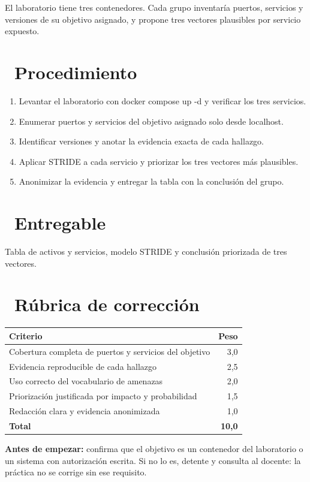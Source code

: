 \documentclass[11pt,a4paper]{article}
\newcommand{\iconotexto}[2]{\textcolor{cyanNeon}{\faIcon{#1}}~#2}
\begin{document}
El laboratorio tiene tres contenedores. Cada grupo inventaría puertos, servicios y versiones de su objetivo asignado, y propone tres vectores plausibles por servicio expuesto.


\section{\iconotexto{list-ol}{Procedimiento}}

\begin{enumerate}[leftmargin=1.4em,itemsep=2pt,topsep=3pt]
  \item Levantar el laboratorio con docker compose up -d y verificar los tres servicios.
  \item Enumerar puertos y servicios del objetivo asignado solo desde localhost.
  \item Identificar versiones y anotar la evidencia exacta de cada hallazgo.
  \item Aplicar STRIDE a cada servicio y priorizar los tres vectores más plausibles.
  \item Anonimizar la evidencia y entregar la tabla con la conclusión del grupo.
\end{enumerate}

\section{\iconotexto{box-open}{Entregable}}

Tabla de activos y servicios, modelo STRIDE y conclusión priorizada de tres vectores.

\section{\iconotexto{ruler-combined}{Rúbrica de corrección}}

\begin{tabularx}{\linewidth}{@{}X r@{}}
\toprule
Criterio & Peso\\
\midrule
Cobertura completa de puertos y servicios del objetivo & 3,0 \\
Evidencia reproducible de cada hallazgo & 2,5 \\
Uso correcto del vocabulario de amenazas & 2,0 \\
Priorización justificada por impacto y probabilidad & 1,5 \\
Redacción clara y evidencia anonimizada & 1,0 \\
\midrule
\textbf{Total} & \textbf{10,0}\\
\bottomrule
\end{tabularx}

\begin{tcolorbox}[cajaMejora]\textbf{Antes de empezar:} confirma que el objetivo es un contenedor del laboratorio o un sistema con autorización escrita. Si no lo es, detente y consulta al docente: la práctica no se corrige sin ese requisito.
\end{tcolorbox}
\end{document}
